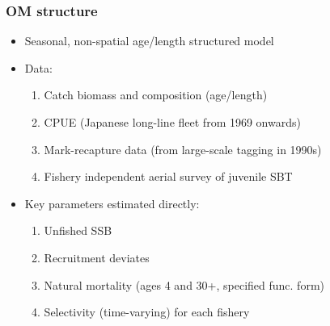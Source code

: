 \documentclass{beamer}
\begin{document}
\begin{frame}
\frametitle{OM structure}
\begin{itemize}
\item Seasonal, non-spatial age/length structured model
\item Data:
    \begin{enumerate}
        \item Catch biomass and composition (age/length)
        \item CPUE (Japanese long-line fleet from 1969 onwards)
        \item Mark-recapture data (from large-scale tagging in 1990s)
        \item Fishery independent aerial survey of juvenile SBT
    \end{enumerate}
\item Key parameters estimated directly:
    \begin{enumerate}
        \item Unfished SSB
        \item Recruitment deviates
        \item Natural mortality (ages 4 and 30+, specified func. form)
        \item Selectivity (time-varying) for each fishery
    \end{enumerate}
\end{itemize}
\end{frame}
\end{document}
